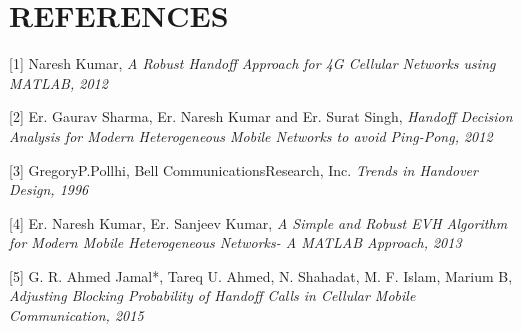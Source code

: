 \documentclass[a4paper]{IEEEtran}
\begin{document}
\section{\textbf{REFERENCES}}

[1] Naresh Kumar, \textit{A Robust Handoff Approach for 4G Cellular Networks using MATLAB, 2012}

[2] Er. Gaurav Sharma, Er. Naresh Kumar and Er. Surat Singh,
\textit{
Handoff Decision Analysis for Modern Heterogeneous Mobile Networks to avoid Ping-Pong, 2012}

[3] GregoryP.Pollhi, Bell CommunicationsResearch, Inc. \textit{Trends in Handover Design, 1996}

[4] Er. Naresh Kumar, Er. Sanjeev Kumar, \textit{A Simple and Robust EVH Algorithm for Modern Mobile Heterogeneous Networks- A MATLAB Approach, 2013}

[5] G. R. Ahmed Jamal*, Tareq U. Ahmed, N. Shahadat, M. F. Islam, Marium B, \textit{Adjusting Blocking Probability of Handoff Calls in Cellular Mobile Communication, 2015}
\end{document}
